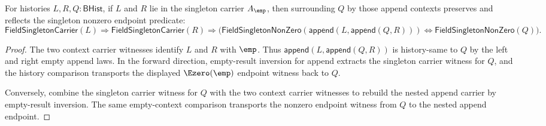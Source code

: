 \begin{theorem}
\label{thm:field-singleton-nonzero-append-context-cancel}
For histories $L,R,Q:\mathsf{BHist}$, if $L$ and $R$ lie in the singleton
carrier $A_{\emp}$, then surrounding $Q$ by those append contexts preserves
and reflects the singleton nonzero endpoint predicate:
$$
\mathsf{FieldSingletonCarrier}(L)\Rightarrow
\mathsf{FieldSingletonCarrier}(R)\Rightarrow
\bigl(
\mathsf{FieldSingletonNonZero}(\mathsf{append}(L,\mathsf{append}(Q,R)))
\Longleftrightarrow
\mathsf{FieldSingletonNonZero}(Q)
\bigr).
$$
\end{theorem}
\begin{proof}
The two context carrier witnesses identify $L$ and $R$ with $\emp$. Thus
$\mathsf{append}(L,\mathsf{append}(Q,R))$ is history-same to $Q$ by the left
and right empty append laws. In the forward direction, empty-result inversion
for append extracts the singleton carrier witness for $Q$, and the history
comparison transports the displayed $\Ezero(\emp)$ endpoint witness back to
$Q$.

Conversely, combine the singleton carrier witness for $Q$ with the two context
carrier witnesses to rebuild the nested append carrier by empty-result
inversion. The same empty-context comparison transports the nonzero endpoint
witness from $Q$ to the nested append endpoint.
\end{proof}

